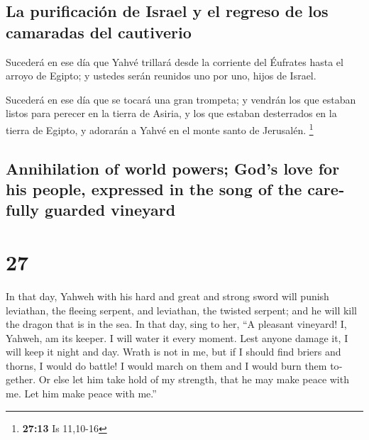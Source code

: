 \begin{paracol}{2}
\hypertarget{la-purificaciuxf3n-de-israel-y-el-regreso-de-los-camaradas-del-cautiverio}{%
\subsection{La purificación de Israel y el regreso de los camaradas del
cautiverio}\label{la-purificaciuxf3n-de-israel-y-el-regreso-de-los-camaradas-del-cautiverio}}

 Sucederá en ese día que Yahvé trillará desde la
corriente del Éufrates hasta el arroyo de Egipto; y ustedes serán
reunidos uno por uno, hijos de Israel.

 Sucederá en ese día que se tocará una gran trompeta; y
vendrán los que estaban listos para perecer en la tierra de Asiria, y
los que estaban desterrados en la tierra de Egipto, y adorarán a Yahvé
en el monte santo de Jerusalén. \footnote{\textbf{27:13} Is 11,10-16}

\switchcolumn
\begin{otherlanguage}{english}

\hypertarget{annihilation-of-world-powers-gods-love-for-his-people-expressed-in-the-song-of-the-carefully-guarded-vineyard}{%
\subsection{Annihilation of world powers; God's love for his people,
expressed in the song of the carefully guarded
vineyard}\label{annihilation-of-world-powers-gods-love-for-his-people-expressed-in-the-song-of-the-carefully-guarded-vineyard}}

\hypertarget{section-53}{%
\section{27}\label{section-53}}

 In that day, Yahweh with his hard and great and strong
sword will punish leviathan, the fleeing serpent, and leviathan, the
twisted serpent; and he will kill the dragon that is in the sea.
 In that day, sing to her, ``A pleasant vineyard!
 I, Yahweh, am its keeper. I will water it every moment.
Lest anyone damage it, I will keep it night and day. 
Wrath is not in me, but if I should find briers and thorns, I would do
battle! I would march on them and I would burn them together.
 Or else let him take hold of my strength, that he may
make peace with me. Let him make peace with me.''


\end{otherlanguage}
\end{paracol}
